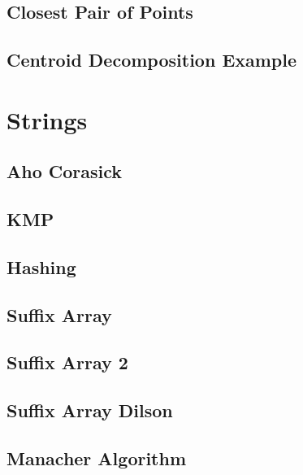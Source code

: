 \subsection{Closest Pair of Points}
\raggedbottom
\hrulefill
\subsection{Centroid Decomposition Example}
\raggedbottom
\hrulefill

\section{Strings}
\subsection{Aho Corasick}
\raggedbottom
\hrulefill
\subsection{KMP}
\raggedbottom
\hrulefill
\subsection{Hashing}
\raggedbottom
\hrulefill
\subsection{Suffix Array}
\raggedbottom
\hrulefill
\subsection{Suffix Array 2}
\raggedbottom
\hrulefill
\subsection{Suffix Array Dilson}
\raggedbottom
\hrulefill
\subsection{Manacher Algorithm}
\raggedbottom
\hrulefill

